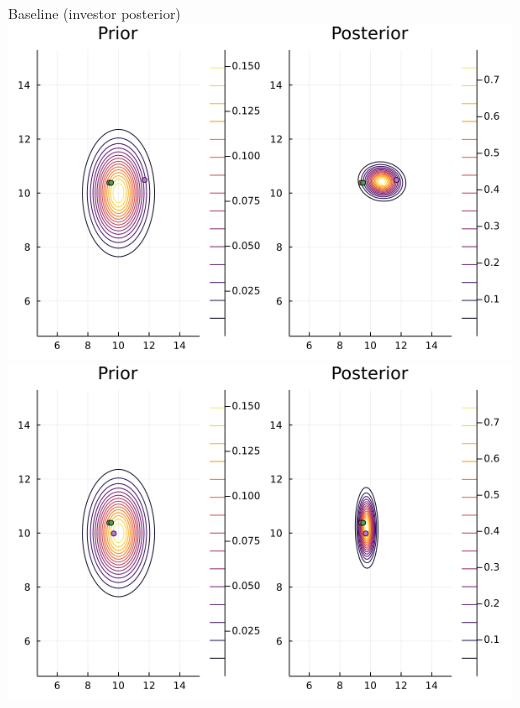 \documentclass[
  ignorenonframetext,
]{beamer}
\begin{document}
\begin{frame}{Baseline (investor posterior)}
\protect\hypertarget{baseline-investor-posterior}{}
\includegraphics[width=0.4\paperwidth]{complexity_files/figure-beamer/unnamed-chunk-12-1}
\includegraphics[width=0.4\paperwidth]{complexity_files/figure-beamer/unnamed-chunk-12-2}
\end{frame}
\end{document}
